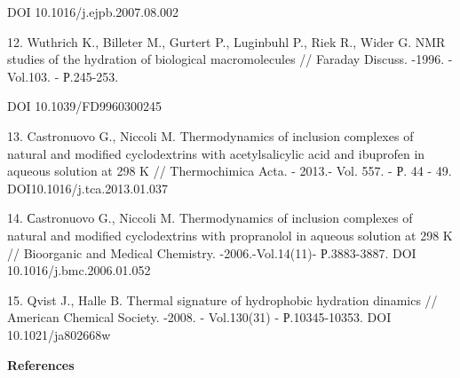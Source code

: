 \begin{noparindent}
DOI 10.1016/j.ejpb.2007.08.002

12. Wuthrich K., Billeter M., Gurtert P., Luginbuhl P., Riek R., Wider
G. NMR studies of the hydration of biological macromolecules // Faraday
Discuss. -1996. - Vol.103. - Р.245-253.

DOI 10.1039/FD9960300245

13. Castronuovo G., Niccoli M. Thermodynamics of inclusion complexes of
natural and modified cyclodextrins with acetylsalicylic acid and
ibuprofen in aqueous solution at 298 K // Thermochimica Acta. - 2013.-
Vol. 557. - Р. 44 - 49. DOI10.1016/j.tca.2013.01.037

14. Сastronuovo G., Niccoli M. Thermodynamics of inclusion complexes of
natural and modified cyclodextrins with propranolol in aqueous solution
at 298 K // Bioorganic and Medical Chemistry. -2006.-Vol.14(11)-
Р.3883-3887. DOI 10.1016/j.bmc.2006.01.052~

15. Qvist J., Halle B. Thermal signature of hydrophobic hydration
dinamics // American Chemical Society. -2008. - Vol.130(31) -
Р.10345-10353. DOI 10.1021/ja802668w
\end{noparindent}

\begin{center}
{\bfseries References}
\end{center}

